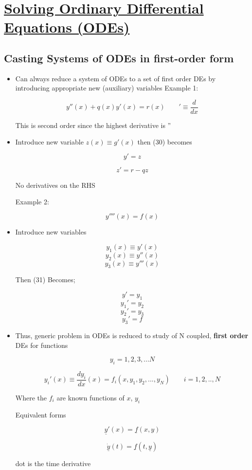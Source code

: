 \def \secname {Solving Ordinary Differential Equations (ODEs)}

\section[\secname]{\hyperlink{toc}{\secname}}


\subsection{Casting Systems  of ODEs in first-order form}

\begin{itemize}
    \item Can always reduce a system of ODEs to a set of first order DEs by introducing appropriate new (auxiliary) variables
    \vspace{10px}
    Example 1:

    \begin{equation}
        y''(x) + q(x) y'(x) = r(x) \qquad '\equiv \frac{d}{dx}
    \end{equation}

    This is second order since the highest derivative is ''

    \item Introduce new variable $z(x) \equiv g'(x) $ then (30) becomes 

    \[ y' = z\]

    \[ z' = r-qz\]

    No derivatives on the RHS

    \vspace{10px}
    Example 2:

    \begin{equation}
        y''''(x) = f(x)
    \end{equation}

    \item Introduce new variables

    \[ y_1 (x) \equiv y'(x)\]
    \[ y_2 (x) \equiv y''(x)\]
    \[ y_3 (x) \equiv y'''(x)\]

    Then (31) Becomes;

    \[ y'=y_1\]
    \[ y_1'=y_2\]
    \[ y_2'=y_3\]
    \[ y_3'= f\]

    \item Thus, generic problem in ODEs is reduced to study of N coupled, \textbf{first order} DEs for functions 

    \[y_i = 1,2,3,... N\]

    \begin{equation}
        y_i'(x) \equiv \frac{dy_i}{dx} (x) = f_i(x,y_1,y_2,...,y_N) \qquad i = 1,2,.., N
    \end{equation}

    Where the $f_i$ are known functions of $x$, $y_i$

    Equivalent forms

    \[\underline{y}'(x) = \underline{f}(x,y)\]

    \[ \underline{\dot{y}}(t) = \underline{f}(t,\underline{y})\]

    dot is the time derivative 
\end{itemize}

